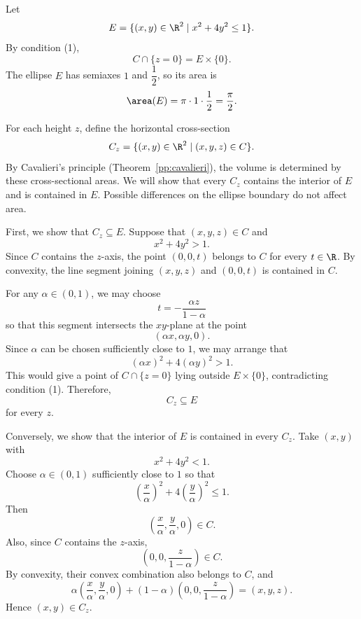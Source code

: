     \begin{solution}
        Let
        \[
            E=\{(x,y)\in\R^2\mid x^2+4y^2\leq 1\}.
        \]
        By condition (1),
        \[
            C\cap\{z=0\}=E\times\{0\}.
        \]
        The ellipse $E$ has semiaxes $1$ and $\dfrac{1}{2}$, so its area is
        \[
            \area(E)
            =
            \pi\cdot 1\cdot \frac{1}{2}
            =
            \frac{\pi}{2}.
        \]

        For each height $z$, define the horizontal cross-section
        \[
            C_z
            =
            \{(x,y)\in\R^2\mid (x,y,z)\in C\}.
        \]
        By Cavalieri's principle (Theorem~\ref{pp:cavalieri}), the volume is determined by these cross-sectional areas. We will show that every $C_z$ contains the interior of $E$ and is contained in $E$. Possible differences on the ellipse boundary do not affect area.

        First, we show that $C_z\subseteq E$. Suppose that $(x,y,z)\in C$ and
        \[
            x^2+4y^2>1.
        \]
        Since $C$ contains the $z$-axis, the point $(0,0,t)$ belongs to $C$ for every $t\in\R$. By
        convexity, the line segment joining $(x,y,z)$ and $(0,0,t)$ is contained in $C$.

        For any $\alpha\in(0,1)$, we may choose
        \[
            t=-\frac{\alpha z}{1-\alpha}
        \]
        so that this segment intersects the $xy$-plane at the point
        \[
            (\alpha x,\alpha y,0).
        \]
        Since $\alpha$ can be chosen sufficiently close to $1$, we may arrange that
        \[
            (\alpha x)^2+4(\alpha y)^2>1.
        \]
        This would give a point of $C\cap\{z=0\}$ lying outside $E\times\{0\}$, contradicting
        condition (1). Therefore,
        \[
            C_z\subseteq E
        \]
        for every $z$.

        Conversely, we show that the interior of $E$ is contained in every $C_z$. Take $(x,y)$ with
        \[
            x^2+4y^2<1.
        \]
        Choose $\alpha\in(0,1)$ sufficiently close to $1$ so that
        \[
            \left(\frac{x}{\alpha}\right)^2
            +
            4\left(\frac{y}{\alpha}\right)^2
            \leq 1.
        \]
        Then
        \[
            \left(\frac{x}{\alpha},\frac{y}{\alpha},0\right)\in C.
        \]
        Also, since $C$ contains the $z$-axis,
        \[
            \left(0,0,\frac{z}{1-\alpha}\right)\in C.
        \]
        By convexity, their convex combination also belongs to $C$, and
        \[
            \alpha
            \left(\frac{x}{\alpha},\frac{y}{\alpha},0\right)
            +
            (1-\alpha)
            \left(0,0,\frac{z}{1-\alpha}\right)
            =
            (x,y,z).
        \]
        Hence $(x,y)\in C_z$.


\end{solution}
